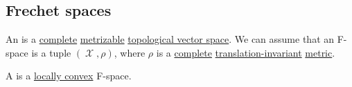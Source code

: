 \subsection{Frechet spaces}\label{subsec:frechet_spaces}

\begin{definition}\label{def:frechet_space}\mcite\cite[1.8 (f)]{Rudin1991Functional}
  An  is a \hyperref[thm:uniform_space_completion]{complete} \hyperref[def:metric_topology]{metrizable} \hyperref[def:topological_vector_space]{topological vector space}. We can assume that an F-space is a tuple \( (\mscrX, \rho) \), where \( \rho \) is a \hyperref[def:complete_metric_space]{complete} \hyperref[def:translation_invariant_metric]{translation-invariant} \hyperref[def:metric_space]{metric}.

  A  is a \hyperref[def:locally_convex_space]{locally convex} F-space.
\end{definition}
